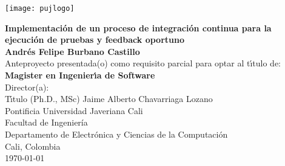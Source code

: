 \begin{center}
\thispagestyle{empty}
\vspace*{0cm}
\begin{center}
    \texttt{[image: pujlogo]}~\\[1.75cm]
\end{center}
\textbf{\huge
Implementación de un proceso de integración continua para la ejecución de pruebas y feedback oportuno}\\[1.75cm]
\Large\textbf{Andrés Felipe Burbano Castillo}\\[1.5cm]
\small Anteproyecto presentada(o) como requisito parcial para optar al
t\'{\i}tulo de:\\
\textbf{Magister en Ingenier\'{\i}a de Software}\\[1.5cm]
Director(a):\\
T\'{\i}tulo (Ph.D., MSc) Jaime Alberto Chavarriaga Lozano\\[1.6cm]
Pontificia Universidad Javeriana Cali\\
Facultad de Ingeniería\\
Departamento de Electrónica y Ciencias de la Computación\\
Cali, Colombia\\
\today\\
\end{center}
